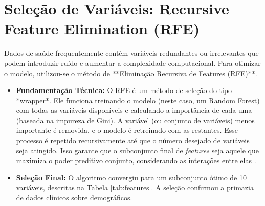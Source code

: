 \documentclass[12pt, a4paper]{report}
\begin{document}
\section{Seleção de Variáveis: Recursive Feature Elimination (RFE)}
Dados de saúde frequentemente contêm variáveis redundantes ou irrelevantes que podem introduzir ruído e aumentar a complexidade computacional. Para otimizar o modelo, utilizou-se o método de **Eliminação Recursiva de Features (RFE)**.
\begin{itemize}
    \item \textbf{Fundamentação Técnica:} O RFE é um método de seleção do tipo *wrapper*. Ele funciona treinando o modelo (neste caso, um Random Forest) com todas as variáveis disponíveis e calculando a importância de cada uma (baseada na impureza de Gini). A variável (ou conjunto de variáveis) menos importante é removida, e o modelo é retreinado com as restantes. Esse processo é repetido recursivamente até que o número desejado de variáveis seja atingido. Isso garante que o subconjunto final de \textit{features} seja aquele que maximiza o poder preditivo conjunto, considerando as interações entre elas \citep{guyon2002gene}.
    \item \textbf{Seleção Final:} O algoritmo convergiu para um subconjunto ótimo de 10 variáveis, descritas na Tabela \ref{tab:features}. A seleção confirmou a primazia de dados clínicos sobre demográficos.
\end{itemize}
\end{document}
